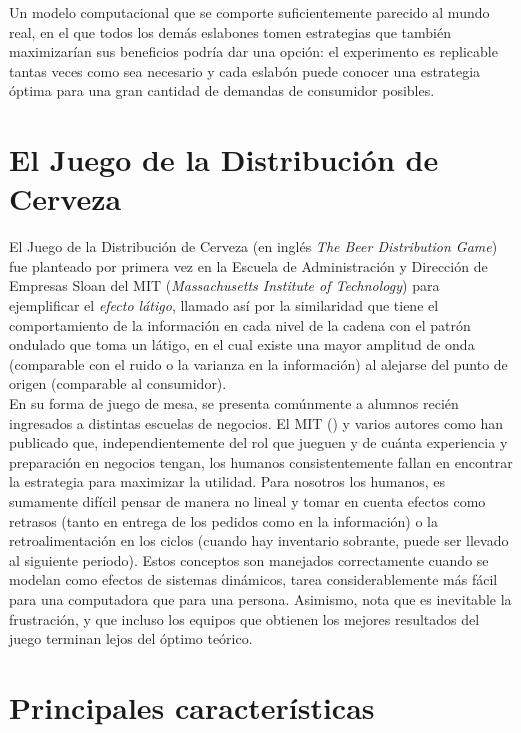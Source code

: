 Un modelo computacional que se comporte suficientemente parecido al mundo real, en el que todos los demás eslabones tomen estrategias que también maximizarían sus beneficios podría dar una opción: el experimento es replicable tantas veces como sea necesario y cada eslabón puede conocer una estrategia óptima para una gran cantidad de demandas de consumidor posibles.\\

\section{El Juego de la Distribuci\'on de Cerveza}

El Juego de la Distribuci\'on de Cerveza (en ingl\'es \textit{The Beer Distribution Game}) \cite{StermanArt} fue planteado por primera vez en la Escuela de Administraci\'on y Direcci\'on de Empresas Sloan del MIT (\textit{Massachusetts Institute of Technology}) para ejemplificar el \textit{efecto l\'atigo}, llamado as\'i por la similaridad que tiene el comportamiento de la informaci\'on en cada nivel de la cadena con el patr\'on ondulado que toma un l\'atigo, en el cual existe una mayor amplitud de onda (comparable con el ruido o la varianza en la informaci\'on) al alejarse del punto de origen (comparable al consumidor). \\

En su forma de juego de mesa, se presenta com\'unmente a alumnos reci\'en ingresados a distintas escuelas de negocios. El MIT (\citet{Dizikes}) y varios autores como \citet{Sterman} han publicado que, independientemente del rol que jueguen y de cu\'anta experiencia y preparaci\'on en negocios tengan, los humanos consistentemente fallan en encontrar la estrategia para maximizar la utilidad. Para nosotros los humanos, es sumamente dif\'icil pensar de manera no lineal y tomar en cuenta efectos como retrasos (tanto en entrega de los pedidos como en la informaci\'on) o la retroalimentaci\'on en los ciclos (cuando hay inventario sobrante, puede ser llevado al siguiente periodo). Estos conceptos son manejados correctamente cuando se modelan como efectos de sistemas din\'amicos, tarea considerablemente m\'as f\'acil para una computadora que para una persona. Asimismo, nota que es inevitable la frustraci\'on, y que incluso los equipos que obtienen los mejores resultados del juego terminan lejos del \'optimo te\'orico.\\

\section{Principales caracter\'isticas}

